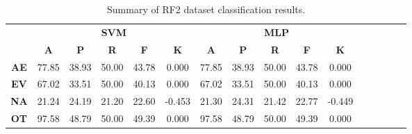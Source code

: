 \begin{landscape}
\begin{table}[htbp]
\footnotesize
\centering
\caption{Summary of RF2 dataset classification results.}
\label{tab:base_female}
\begin{tabular}{|c|c|c|c|c|c|c|c|c|c|c|c|c|c|c|c|}
\hline
\multirow{2}{*}{}	& \multicolumn{5}{c|}{\textbf{SVM}}												& \multicolumn{5}{c|}{\textbf{MLP}}												\\ \cline{2-11} 
					& \textbf{A}	& \textbf{P}	& \textbf{R}	& \textbf{F}	& \textbf{K}	& \textbf{A}	& \textbf{P}	& \textbf{R}	& \textbf{F}	& \textbf{K}	\\ \hline
\textbf{AE}			& 77.85			& 38.93			& 50.00			& 43.78			& 0.000			& 77.85			& 38.93			& 50.00			& 43.78			& 0.000			\\ \hline
\textbf{EV}			& 67.02			& 33.51			& 50.00			& 40.13			& 0.000			& 67.02			& 33.51			& 50.00			& 40.13			& 0.000			\\ \hline
\textbf{NA}			& 21.24			& 24.19			& 21.20			& 22.60			& -0.453			& 21.30			& 24.31			& 21.42			& 22.77			& -0.449			\\ \hline
\textbf{OT}			& 97.58			& 48.79			& 50.00			& 49.39			& 0.000			& 97.58			& 48.79			& 50.00			& 49.39			& 0.000			\\ \hline
\end{tabular}
\end{table}
\end{landscape}
